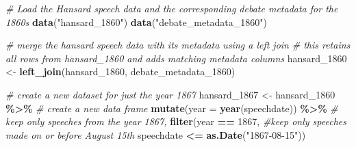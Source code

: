 \documentclass[
]{article}
\newenvironment{Shaded}{\begin{snugshade}}{\end{snugshade}}
\newcommand{\AttributeTok}[1]{\textcolor[rgb]{0.13,0.29,0.53}{#1}}
\newcommand{\CommentTok}[1]{\textcolor[rgb]{0.56,0.35,0.01}{\textit{#1}}}
\newcommand{\DecValTok}[1]{\textcolor[rgb]{0.00,0.00,0.81}{#1}}
\newcommand{\FunctionTok}[1]{\textcolor[rgb]{0.13,0.29,0.53}{\textbf{#1}}}
\newcommand{\NormalTok}[1]{#1}
\newcommand{\OtherTok}[1]{\textcolor[rgb]{0.56,0.35,0.01}{#1}}
\newcommand{\SpecialCharTok}[1]{\textcolor[rgb]{0.81,0.36,0.00}{\textbf{#1}}}
\newcommand{\StringTok}[1]{\textcolor[rgb]{0.31,0.60,0.02}{#1}}
\begin{document}
\begin{Shaded}
\begin{Highlighting}[]
\CommentTok{\# Load the Hansard speech data and the corresponding debate metadata for the 1860s}
\FunctionTok{data}\NormalTok{(}\StringTok{"hansard\_1860"}\NormalTok{)}
\FunctionTok{data}\NormalTok{(}\StringTok{"debate\_metadata\_1860"}\NormalTok{)}

\CommentTok{\# merge the hansard speech data with its metadata using a left join}
\CommentTok{\# this retains all rows from hansard\_1860 and adds matching metadata columns}
\NormalTok{hansard\_1860 }\OtherTok{\textless{}{-}} \FunctionTok{left\_join}\NormalTok{(hansard\_1860, debate\_metadata\_1860)}

\CommentTok{\# create a new dataset for just the year 1867}
\NormalTok{hansard\_1867 }\OtherTok{\textless{}{-}}\NormalTok{ hansard\_1860 }\SpecialCharTok{\%\textgreater{}\%} \CommentTok{\# create a new data frame}
  \FunctionTok{mutate}\NormalTok{(}\AttributeTok{year =} \FunctionTok{year}\NormalTok{(speechdate)) }\SpecialCharTok{\%\textgreater{}\%} \CommentTok{\# keep only speeches from the year 1867, }
  \FunctionTok{filter}\NormalTok{(year }\SpecialCharTok{==} \DecValTok{1867}\NormalTok{, }\CommentTok{\#keep only speeches made on or before August 15th}
\NormalTok{         speechdate }\SpecialCharTok{\textless{}=} \FunctionTok{as.Date}\NormalTok{(}\StringTok{"1867{-}08{-}15"}\NormalTok{))}
\end{Highlighting}
\end{Shaded}
\end{document}
